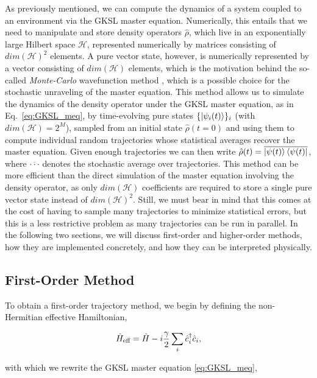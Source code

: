 As previously mentioned, we can compute the dynamics of a system coupled to an environment via the GKSL master equation. Numerically, this entails that we need to manipulate and store density operators $\hat{\rho}$, which live in an exponentially large Hilbert space $\mathcal{H}$, represented numerically by matrices consisting of $dim(\mathcal{H})^2$ elements. A pure vector state, however, is numerically represented by a vector consisting of $dim(\mathcal{H})$ elements, which is the motivation behind the so-called \textit{Monte-Carlo} wavefunction method \cite{dum1992, dalibard1992, molmer1993, carmichael1993, plenio1998}, which is a possible choice for the stochastic unraveling of the master equation. This method allows us to simulate the dynamics of the density operator under the GKSL master equation, as in Eq.~\ref{eq:GKSL_meq}, by time-evolving pure states $\{\ket{\psi_i(t)}\}_i$ (with $dim(\mathcal{H}) = 2^M$), sampled from an initial state $\hat{\rho}(t=0)$ and using them to compute individual random trajectories whose statistical averages recover the master equation. Given enough trajectories we can then write $\hat{\rho}(t) = \overline{\ket{\psi(t)}\bra{\psi(t)}}$, where $\overline{\cdot\cdot\cdot}$ denotes the stochastic average over trajectories. This method can be more efficient than the direct simulation of the master equation involving the density operator, as only $dim(\mathcal{H})$ coefficients are required to store a single pure vector state instead of $dim(\mathcal{H})^2$. Still, we must bear in mind that this comes at the cost of having to sample many trajectories to minimize statistical errors, but this is a less restrictive problem as many trajectories can be run in parallel. In the following two sections, we will discuss first-order and higher-order methods, how they are implemented concretely, and how they can be interpreted physically. 

\subsection{First-Order Method}

To obtain a first-order trajectory method, we begin by defining the non-Hermitian effective Hamiltonian,

\begin{equation}
	\label{eq:heff}
	\hat{H}_\text{eff} = \hat{H} - i  \frac{\gamma}{2} \sum\limits_i \hat{c}_i^\dagger \hat{c}_i,
\end{equation}

with which we rewrite the GKSL master equation \ref{eq:GKSL_meq},

